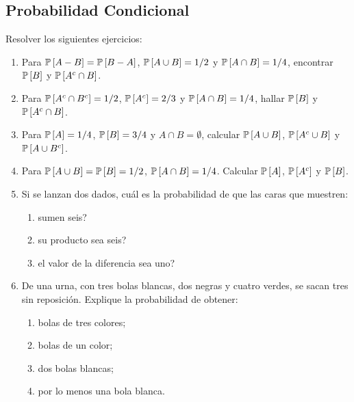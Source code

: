\subsection{Probabilidad Condicional}


\begin{Ejer} Resolver los siguientes ejercicios:
\begin{enumerate}

\item Para $\mathbb{P}\left[A-B\right]=\mathbb{P}\left[B-A\right]$, $\mathbb{P}\left[A\cup B\right]=1/2$ y $\mathbb{P}\left[A\cap B\right]=1/4$, encontrar $\mathbb{P}\left[B\right]$ y $\mathbb{P}\left[A^{c}\cap B\right]$.

\item Para $\mathbb{P}\left[A^{c}\cap B^{c}\right]=1/2$, $\mathbb{P}\left[A^{c}\right]=2/3$ y $\mathbb{P}\left[A\cap B\right]=1/4$, hallar $\mathbb{P}\left[B\right]$ y $\mathbb{P}\left[A^{c}\cap B\right]$.

\item Para $\mathbb{P}\left[A\right]=1/4$, $\mathbb{P}\left[B\right]=3/4$ y $A\cap B=\emptyset$, calcular $\mathbb{P}\left[A\cup B\right]$, $\mathbb{P}\left[A^{c}\cup B\right]$ y $\mathbb{P}\left[A\cup B^{c}\right]$.

\item Para $\mathbb{P}\left[A\cup B\right]=\mathbb{P}\left[B\right]=1/2$, $\mathbb{P}\left[A\cap B\right]=1/4$. Calcular $\mathbb{P}\left[A\right]$, $\mathbb{P}\left[A^{c}\right]$ y $\mathbb{P}\left[B\right]$.

\item Si se lanzan dos dados,  cu\'{a}l es la probabilidad de que las caras que muestren:
\begin{enumerate}
\item sumen seis?
\item su producto sea seis?
\item el valor de la diferencia sea uno?
\end{enumerate}

\item De una urna, con tres bolas blancas, dos negras y cuatro verdes, se sacan tres sin reposici\'{o}n. Explique la probabilidad de obtener:
\begin{enumerate}
\item bolas de tres colores;
\item bolas de un color;
\item dos bolas blancas;
\item por lo menos una bola blanca.
\end{enumerate}


\end{enumerate}
\end{Ejer}
